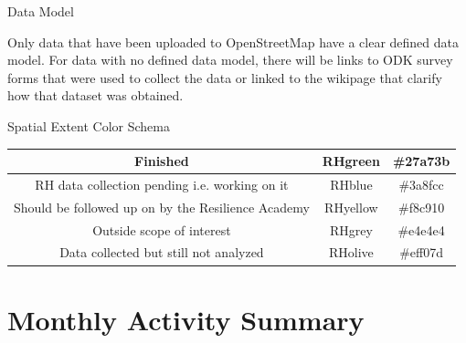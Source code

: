 \documentclass[a4paper,12pt,twoside]{article}
\begin{document}
{\color{RHblue}\Large{Data Model}}\bigskip

Only data that have been uploaded to OpenStreetMap have a clear defined data model. For data with no defined data model, there will be links to ODK survey forms that were used to collect the data or linked to the wikipage that clarify how that dataset was obtained.
\bigskip

{\color{RHblue}\Large{Spatial Extent Color Schema}}
\medskip

\begin{tabular}{|c|c|c|}
\hline
Finished & {\colorbox{code}{RHgreen}} & \#27a73b  \\
\hline
RH data collection pending i.e. working on it & RHblue & \#3a8fcc \\
\hline
Should be followed up on by the Resilience Academy & RHyellow & \#f8c910 \\
\hline
Outside scope of interest & RHgrey & \#e4e4e4 \\
\hline
Data collected but still not analyzed & RHolive & \#eff07d \\
\hline
\end{tabular}

\newpage
\section{Monthly Activity Summary}
\end{document}
